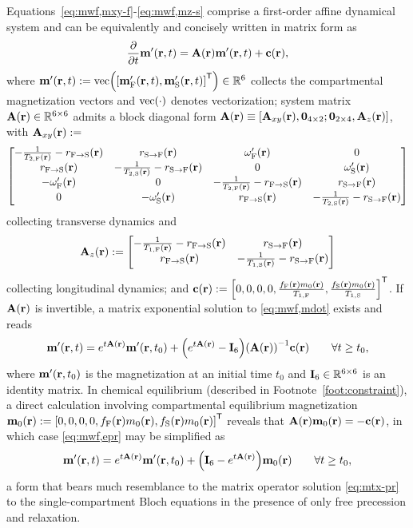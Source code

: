 Equations~\eqref{eq:mwf,mxy-f}-\eqref{eq:mwf,mz-s}
comprise a first-order affine dynamical system
and can be equivalently and concisely written
in matrix form as
\begin{align}
	\dela{t} \bmmp\prt = \bmA\pr \bmmp\prt + \bmc\pr,
	\label{eq:mwf,mdot}
\end{align}	
where $\bmmp\prt := \vect{\brac{\bmmpf\prt, \bmmps\prt}\tpose} \in \reals{6}$
collects the compartmental magnetization vectors
and $\vect{\cdot}$ denotes vectorization;
system matrix $\bmA\pr \in \reals{6 \times 6}$ 
admits a block diagonal form
$\bmA\pr \equiv \brac{\bmAxy\pr, \zeros{4 \times 2}; \zeros{2 \times 4}, \bmAz\pr}$,
with $\bmAxy\pr :=$
\begin{align}
	\begin{bmatrix}
		-\frac{1}{\tf{2}\pr}-\rfs\pr & \rsf\pr & \ompf\pr & 0 \\
		\rfs\pr & -\frac{1}{\ts{2}\pr}-\rsf\pr & 0 & \omps\pr \\
		-\ompf\pr & 0 & -\frac{1}{\tf{2}\pr}-\rfs\pr & \rsf\pr \\
		0 & -\omps\pr & \rfs\pr & -\frac{1}{\ts{2}\pr}-\rsf\pr 
	\end{bmatrix}
	\label{eq:mwf,Axy}
\end{align}
collecting transverse dynamics and
\begin{align}
	\bmAz\pr :=
	\begin{bmatrix}
		-\frac{1}{\tf{1}\pr}-\rfs\pr & \rsf\pr \\
		\rfs\pr & -\frac{1}{\ts{1}\pr}-\rsf\pr
		\label{eq:mwf,Az}
	\end{bmatrix}
\end{align}
collecting longitudinal dynamics; and
$\bmc\pr := \brac{0, 0, 0, 0, 
\frac{\ff\pr \mzero\pr}{\tf{1}}, 
\frac{\fs\pr \mzero\pr}{\ts{1}}}\tpose$.
If $\bmA\pr$ is invertible,
a matrix exponential solution 
to \eqref{eq:mwf,mdot}
exists and reads
\begin{align}
	\bmmp\prt = e^{t\bmA\pr} \bmmp\prtz +
		\paren{e^{t\bmA\pr} - \eye{6}} \inv{\bmA\pr} \bmc\pr
		\qquad \forall t \geq t_0,
		\label{eq:mwf,epr}
\end{align}
where $\bmmp\prtz$ is the magnetization
at an initial time $t_0$
and $\mathbf{I}_{6} \in \mathbb{R}^{6 \times 6}$ 
is an identity matrix.
In chemical equilibrium
(described in Footnote~\ref{foot:constraint}),
a direct calculation involving 
compartmental equilibrium magnetization
$\bmmzero\pr := \brac{0,0,0,0,\ff\pr\mzero\pr,\fs\pr\mzero\pr}\tpose$
reveals that $\bmA\pr \bmmzero\pr = -\bmc\pr$,
in which case \eqref{eq:mwf,epr} may be simplified as
\begin{align}
	\bmmp\prt = e^{t\bmA\pr} \bmmp\prtz +
		\paren{\eye{6} - e^{t\bmA\pr}} \bmmzero\pr
		\qquad \forall t \geq t_0,
		\label{eq:mwf,epr-eq}
\end{align}
a form
that bears much resemblance  
to the matrix operator solution
\eqref{eq:mtx-pr}
to the single-compartment Bloch equations
in the presence
of only free precession and relaxation.


